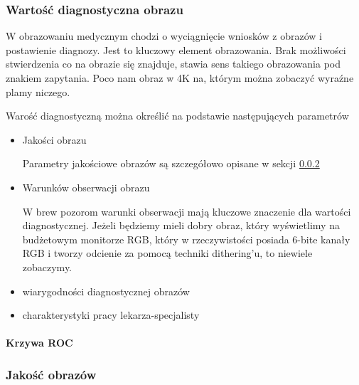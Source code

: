 \subsubsection{Wartość diagnostyczna obrazu}

W obrazowaniu medycznym chodzi o wyciągnięcie wniosków z obrazów i postawienie diagnozy.
Jest to kluczowy element obrazowania.
Brak możliwości stwierdzenia co na obrazie się znajduje, stawia sens takiego obrazowania pod znakiem zapytania.
Poco nam obraz w 4K na, którym można zobaczyć wyraźne plamy niczego.

Warość diagnostyczną można określić na podstawie następujących parametrów
\begin{itemize}
    \item Jakości obrazu
    
    Parametry jakościowe obrazów są szczegółowo opisane w sekcji \ref{sec:image-quality}

    \item Warunków obserwacji obrazu

    W brew pozorom warunki obserwacji mają kluczowe znaczenie dla wartości diagnostycznej.
    Jeżeli będziemy mieli dobry obraz, który wyświetlimy na budżetowym monitorze RGB, który w rzeczywistości posiada 6-bite kanały RGB i tworzy odcienie za pomocą techniki dithering'u, to niewiele zobaczymy.

    \item wiarygodności diagnostycznej obrazów

    \item charakterystyki pracy lekarza-specjalisty

\end{itemize}

\paragraph{Krzywa ROC}

\subsubsection{Jakość obrazów}
\label{sec:image-quality}

